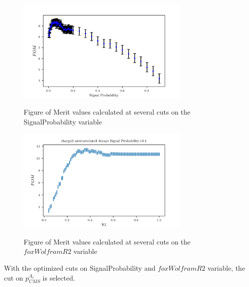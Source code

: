 \begin{figure}[H]
    {\includegraphics[width=0.75\textwidth]{03-Selection/figs/charged_anticorrLambdaC_FOMvsSigProb.png}}
    \caption{Figure of Merit values calculated at several cuts on the SignalProbability variable}
    \label{fig:charged_anticorrLambdaC_FOMvsSigProb}
    \end{figure}



\begin{figure}[H]
    {\includegraphics[width=0.75\textwidth]{03-Selection/figs/acorr_chargedB_FOMvsR2_cut_SigProbOpt.png}}
    \caption{Figure of Merit values calculated at several cuts on the $foxWolframR2$ variable}
    \label{fig:acorr_chargedB_FOMvsR2_cut_SigProbOpt}
    \end{figure}


    With the optimized cuts on SignalProbability and $foxWolframR2$ variable, the cut on $p^{\Lambda_c}_{CMS}$ is selected.\\
    \vspace{0.2 cm}
    

